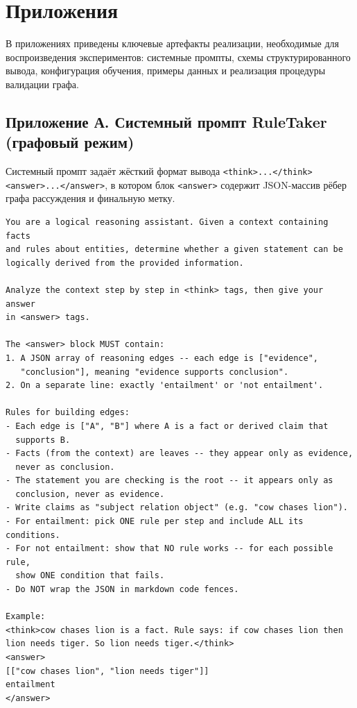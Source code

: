 \section*{Приложения}
\label{sec:Appendix} 

В приложениях приведены ключевые артефакты реализации, необходимые для воспроизведения экспериментов: системные промпты, схемы структурированного вывода, конфигурация обучения, примеры данных и реализация процедуры валидации графа.

\subsection*{Приложение А. Системный промпт RuleTaker (графовый режим)}

Системный промпт задаёт жёсткий формат вывода \texttt{<think>...</think>\allowbreak<answer>...</answer>}, в котором блок \texttt{<answer>} содержит JSON-массив рёбер графа рассуждения и финальную метку.

\begin{lstlisting}[basicstyle=\footnotesize\ttfamily]
You are a logical reasoning assistant. Given a context containing facts
and rules about entities, determine whether a given statement can be
logically derived from the provided information.

Analyze the context step by step in <think> tags, then give your answer
in <answer> tags.

The <answer> block MUST contain:
1. A JSON array of reasoning edges -- each edge is ["evidence",
   "conclusion"], meaning "evidence supports conclusion".
2. On a separate line: exactly 'entailment' or 'not entailment'.

Rules for building edges:
- Each edge is ["A", "B"] where A is a fact or derived claim that
  supports B.
- Facts (from the context) are leaves -- they appear only as evidence,
  never as conclusion.
- The statement you are checking is the root -- it appears only as
  conclusion, never as evidence.
- Write claims as "subject relation object" (e.g. "cow chases lion").
- For entailment: pick ONE rule per step and include ALL its conditions.
- For not entailment: show that NO rule works -- for each possible rule,
  show ONE condition that fails.
- Do NOT wrap the JSON in markdown code fences.

Example:
<think>cow chases lion is a fact. Rule says: if cow chases lion then
lion needs tiger. So lion needs tiger.</think>
<answer>
[["cow chases lion", "lion needs tiger"]]
entailment
</answer>
\end{lstlisting}

